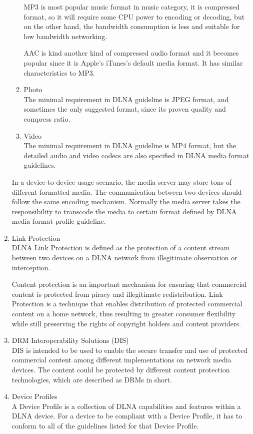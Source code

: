 \begin{enumerate}
\begin{enumerate}
MP3 is most popular music format in music category, it is compressed format, so it will require 
some CPU power to encoding or decoding, but on the other hand, the bandwidth consumption is less 
and suitable for low bandwidth networking.

AAC is kind another kind of compressed audio format and it becomes popular since it is Apple's 
iTunes's default media format. It has similar characteristics to MP3.
\item Photo \\
The minimal requirement in DLNA guideline is JPEG format, and sometimes the only suggested format, 
since its proven quality and compress ratio.
\item Video \\
The minimal requirement in DLNA guideline is MP4 format, but the detailed audio and video codecs 
are also specified in DLNA media format guidelines.
\end{enumerate}
In a device-to-device usage scenario, the media server may store tons of different formatted 
media. The communication between two devices should follow the same encoding mechanism. Normally 
the media server takes the responsibility to transcode the media to certain format defined by 
DLNA media format profile guideline. 
\item Link Protection \\
DLNA Link Protection is defined as the protection of a content stream between two 
devices on a DLNA network from illegitimate observation or interception.

Content protection is an important mechanism for ensuring that commercial content is protected 
from piracy and illegitimate redistribution. Link Protection is a technique that enables 
distribution of protected commercial content on a home network, thus resulting in greater 
consumer flexibility while still preserving the rights of copyright holders and content providers.
\item DRM Interoperability Solutions (DIS) \\
DIS is intended to be used to enable the secure transfer and use of protected
commercial content among different implementations on network media devices.
The content could be protected by different content protection technologies,
which are described as DRMs in short.
\item Device Profiles \\
A Device Profile is a collection of DLNA capabilities and features within a DLNA device. For a device 
to be compliant with a Device Profile, it has to conform to all of the guidelines listed for that 
Device Profile.


\end{enumerate}

